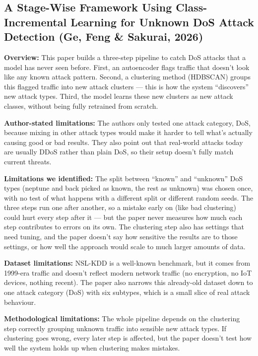 \documentclass[10pt]{article}
\newcommand{\sumitem}[2]{\noindent\textbf{#1:} #2\par}
\begin{document}
\subsection{A Stage-Wise Framework Using Class-Incremental Learning for Unknown DoS Attack Detection (Ge, Feng \& Sakurai, 2026)}

\sumitem{Overview}{This paper builds a three-step pipeline to catch DoS attacks that a model has never seen before. First, an autoencoder flags traffic that doesn't look like any known attack pattern. Second, a clustering method (HDBSCAN) groups this flagged traffic into new attack clusters --- this is how the system \enquote{discovers} new attack types. Third, the model learns these new clusters as new attack classes, without being fully retrained from scratch.}

\sumitem{Author-stated limitations}{The authors only tested one attack category, DoS, because mixing in other attack types would make it harder to tell what's actually causing good or bad results. They also point out that real-world attacks today are usually DDoS rather than plain DoS, so their setup doesn't fully match current threats.}

\sumitem{Limitations we identified}{The split between \enquote{known} and \enquote{unknown} DoS types (neptune and back picked as known, the rest as unknown) was chosen once, with no test of what happens with a different split or different random seeds. The three steps run one after another, so a mistake early on (like bad clustering) could hurt every step after it --- but the paper never measures how much each step contributes to errors on its own. The clustering step also has settings that need tuning, and the paper doesn't say how sensitive the results are to those settings, or how well the approach would scale to much larger amounts of data.}

\sumitem{Dataset limitations}{NSL-KDD is a well-known benchmark, but it comes from 1999-era traffic and doesn't reflect modern network traffic (no encryption, no IoT devices, nothing recent). The paper also narrows this already-old dataset down to one attack category (DoS) with six subtypes, which is a small slice of real attack behaviour.}

\sumitem{Methodological limitations}{The whole pipeline depends on the clustering step correctly grouping unknown traffic into sensible new attack types. If clustering goes wrong, every later step is affected, but the paper doesn't test how well the system holds up when clustering makes mistakes.}
\end{document}
